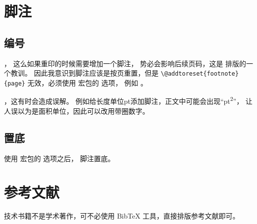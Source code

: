 \section{脚注} %

\subsection{编号}
，
这么如果重印的时候需要增加一个脚注，
势必会影响后续页码，这是 \mybooktitle 排版的一个教训。
因此我意识到脚注应该是按页重置，但是 \verb|\@addtoreset{footnote}{page}|
无效，必须使用  宏包的  选项，
例如 。

，这有时会造成误解。
例如给长度单位pt添加脚注，正文中可能会出现“pt\textsuperscript{2}”，
让人误以为是面积单位，因此可以改用带圈数字。

\subsection{置底}
\centerline{%
\quad{}}

使用  宏包的  选项之后，
脚注置底。\nopagebreak

\centerline{%
\quad{}}

\section{参考文献}
技术书籍不是学术著作，可不必使用 BibTeX 工具，直接排版参考文献即可。
